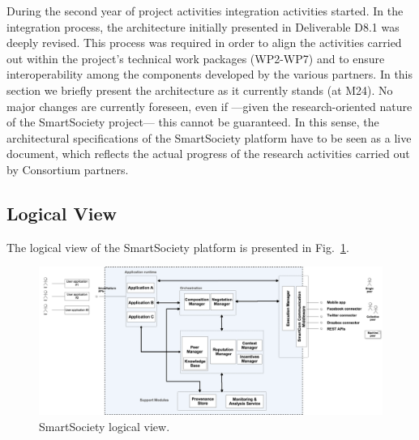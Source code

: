 During the second year of project activities integration activities
started. In the integration process, the architecture initially
presented in Deliverable D8.1 was deeply revised. This process was
required in order to align the activities carried out within the
project's technical work packages (WP2-WP7) and to ensure
interoperability among the components developed by the various
partners. In this section we briefly present the architecture as it
currently stands (at M24). No major changes are currently foreseen,
even if ---given the research-oriented nature of the SmartSociety
project--- this cannot be guaranteed. In this sense, the architectural
specifications of the SmartSociety platform have to be seen as a live document, which reflects the
actual progress of the research activities carried out by Consortium
partners. 

\subsection{Logical View}
The logical view of the SmartSociety platform is presented in Fig.~\ref{fig:logical_view}. %

\begin{figure}
 \centering
 \includegraphics[width=1\textwidth]{figs/functional_diagram}%
 \caption{SmartSociety logical view.}
 \label{fig:logical_view}
\end{figure}

